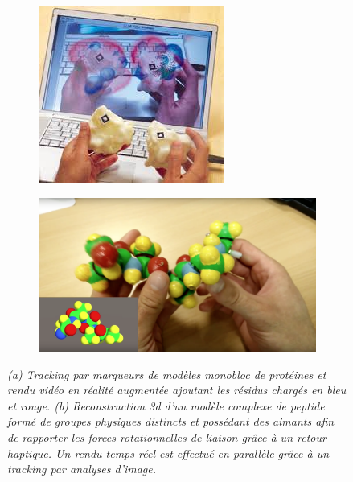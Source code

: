 \begin{figure}[h]
  \begin{subfigure}{.5\textwidth}
  \centering
  {\includegraphics[width=0.9\linewidth]{./figures/ch2/tangible_marker}}
    \caption{}
    \label{Fig:tangible_marker}
  \end{subfigure}
  \begin{subfigure}{.4\textwidth}
  \centering
  {\includegraphics[width=0.7\linewidth]{./figures/ch2/tangible_xav}}
    \caption{}
    \label{Fig:tangible_xav}
  \hspace{0.3cm}
  \end{subfigure}
  \caption[(a) Système de Réalité Augmentée grâce à des modèles tangibles de protéines. (b) Reconstruction 3d d'un modèle à partir d'un modèle physique complexe.]{\it (a) Tracking par marqueurs de modèles monobloc de protéines et rendu vidéo en réalité augmentée ajoutant les résidus chargés en bleu et rouge.
  (b) Reconstruction 3d d'un modèle complexe de peptide formé de groupes physiques distincts et possédant des aimants afin de rapporter les forces rotationnelles de liaison grâce à un retour haptique. Un rendu temps réel est effectué en parallèle grâce à un tracking par analyses d'image. 
  }
\end{figure}


